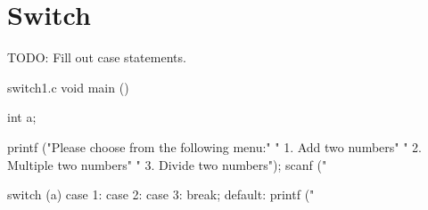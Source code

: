 \chapter{Switch}

TODO: Fill out case statements.

\begin{code}{switch1.c}
void main ()
{
    int a;

    printf ("Please choose from the following menu:\n"
            "  1. Add two numbers\n"
            "  2. Multiple two numbers\n"
            "  3. Divide two numbers\n");
    scanf ("%

    switch (a) {
    case 1:
    case 2:
    case 3:
        break;
    default:
        printf ("%
    }
}
\end{code}
